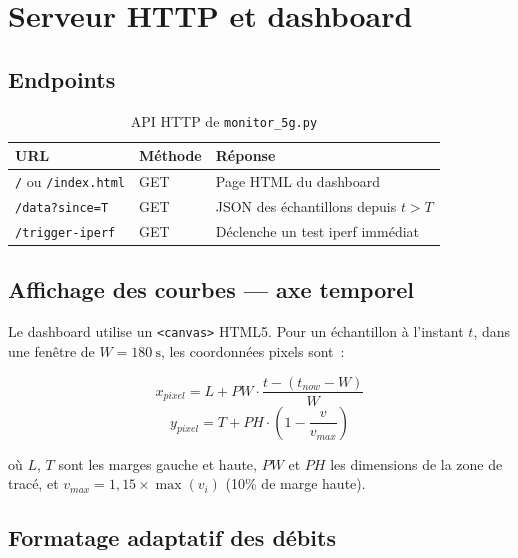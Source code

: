 \documentclass[a4paper,12pt]{article}
\begin{document}
\section{Serveur HTTP et dashboard}

\subsection{Endpoints}

\begin{table}[H]
\centering
\begin{tabular}{lll}
\toprule
\textbf{URL} & \textbf{Méthode} & \textbf{Réponse} \\
\midrule
\texttt{/} ou \texttt{/index.html} & GET & Page HTML du dashboard \\
\texttt{/data?since=T} & GET & JSON des échantillons depuis $t > T$ \\
\texttt{/trigger-iperf} & GET & Déclenche un test iperf immédiat \\
\bottomrule
\end{tabular}
\caption{API HTTP de \texttt{monitor\_5g.py}}
\end{table}

\subsection{Affichage des courbes — axe temporel}

Le dashboard utilise un \texttt{<canvas>} HTML5. Pour un échantillon à l'instant $t$,
dans une fenêtre de $W = 180\ \text{s}$, les coordonnées pixels sont~:

\begin{equation}
  x_{pixel} = L + PW \cdot \frac{t - (t_{now} - W)}{W}
\end{equation}
\begin{equation}
  y_{pixel} = T + PH \cdot \left(1 - \frac{v}{v_{max}}\right)
\end{equation}

où $L$, $T$ sont les marges gauche et haute, $PW$ et $PH$ les dimensions de la zone de
tracé, et $v_{max} = 1{,}15 \times \max(v_i)$ (10\% de marge haute).

\subsection{Formatage adaptatif des débits}
\end{document}
